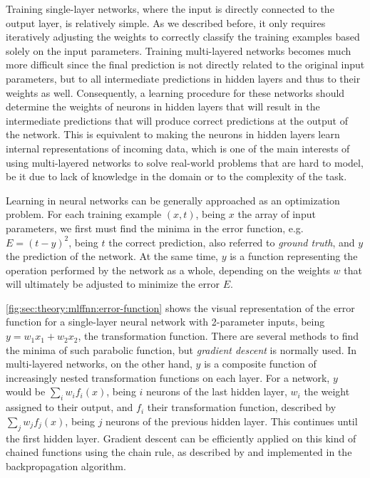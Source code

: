 Training single-layer networks, where the input is directly connected to the output layer, is relatively simple.
As we described before, it only requires iteratively adjusting the weights to correctly classify the training examples based solely on the input parameters.
Training multi-layered networks becomes much more difficult since the final prediction is not directly related to the original input parameters, but to all intermediate predictions in hidden layers and thus to their weights as well.
Consequently, a learning procedure for these networks should determine the weights of neurons in hidden layers that will result in the intermediate predictions that will produce correct predictions at the output of the network.
This is equivalent to making the neurons in hidden layers learn internal representations of incoming data, which is one of the main interests of using multi-layered networks to solve real-world problems that are hard to model, be it due to lack of knowledge in the domain or to the complexity of the task.

Learning in neural networks can be generally approached as an optimization problem.
For each training example $(x, t)$, being $x$ the array of input parameters, we first must find the minima in the error function, e.g. $E = (t - y)^2$, being $t$ the correct prediction, also referred to \emph{ground truth}, and $y$ the prediction of the network.
At the same time, $y$ is a function representing the operation performed by the network as a whole, depending on the weights $w$ that will ultimately be adjusted to minimize the error $E$.

\autoref{fig:sec:theory:mlffnn:error-function} shows the visual representation of the error function for a single-layer neural network with 2-parameter inputs, being $y = w_1 x_1 + w_2 x_2$, the transformation function.
There are several methods to find the minima of such parabolic function, but \emph{gradient descent} is normally used.
In multi-layered networks, on the other hand, $y$ is a composite function of increasingly nested transformation functions on each layer.
For a network, $y$ would be $\sum_i w_i f_i(x)$, being $i$ neurons of the last hidden layer, $w_i$ the weight assigned to their output, and $f_i$ their transformation function, described by $\sum_j w_j f_j(x)$, being $j$ neurons of the previous hidden layer.
This continues until the first hidden layer.
Gradient descent can be efficiently applied on this kind of chained functions using the chain rule, as described by \citet{Linnainmaa1976} and implemented in the backpropagation algorithm.

